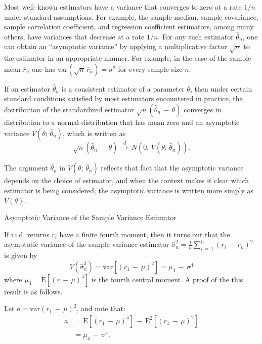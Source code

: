 \documentclass[graybox,envcountchap,sectrefs]{svmono}\usepackage[]{graphicx}\usepackage[]{xcolor}
\begin{document}
\begin{appendices}
Most well--known estimators have a variance that converges to zero
at a rate $1/n$ under standard assumptions. For example, the sample
median, sample covariance, sample correlation coefficient, and regression
coefficient estimators, among many others, have variances that decrease
at a rate $1/n$. For any such estimator $\hat{\theta}_{n}$, one
can obtain an ``asymptotic variance'' by applying a multiplicative
factor $\sqrt{n}$ to the estimator in an appropriate manner. For
example, in the case of the sample mean $\overline{r}_{n}$ one has
$\mathrm{var}\left(\sqrt{n}\,\overline{r}_{n}\right)=\sigma^{2}$
for every sample size $n$.

If an estimator $\hat{\theta}_{n}$ is a consistent estimator of a
parameter $\theta$, then under certain standard conditions satisfied
by most estimators encountered in practice, the distribution of the
standardized estimator $\sqrt{n}\left(\hat{\theta}_{n}\,-\,\theta\right)$
converges in distribution to a normal distribution that has mean zero
and an asymptotic variance $V\left(\theta;\,\hat{\theta}_{n}\right)$,
which is written as
\begin{equation}
\sqrt{n}\left(\hat{\theta}_{n}\,-\,\theta\right)\,\overset{d}{\rightarrow}\,N\left(0,\,V\left(\theta;\,\hat{\theta}_{n}\right)\right).\label{eq: sqrtnStandardizedEstimator}
\end{equation}

The argument $\hat{\theta}_{n}$ in $V\left(\theta;\,\hat{\theta}_{n}\right)$
reflects that fact that the asymptotic variance depends on the choice
of estimator, and when the context makes it clear which estimator
is being considered, the asymptotic variance is written more simply
as $V\left(\theta\right)$.
\begin{example}
Asymptotic Variance of the Sample Variance Estimator
\end{example}
If i.i.d. returns $r_{i}$ have a finite fourth moment, then it turns
out that the asymptotic variance of the sample variance estimator
$\hat{\sigma}_{n}^{2}=\frac{1}{n}\sum_{i\,=\,1}^{n}\left(r_{i}\,-\,\bar{r}_{n}\right)^{2}$
is given by
\begin{equation}
V(\hat{\sigma}_{n}^{2})=\mathrm{var}\left[\left(r_{1}\,-\,\mu\right)^{2}\right]=\mu_{4}\,-\,\sigma^{4}\label{eq: asympVarianceSampleVariance}
\end{equation}
where $\mu_{4}=\mathrm{E}\left[(r\,-\,\mu)^{4}\right]$ is the fourth
central moment. A proof of the this result is as follows.

Let $a=\mathrm{var}\left(r_{1}\,-\,\mu\right)^{2}$, and note that:
\begin{align*}
a & =\mathrm{E}\left[(r_{1}\,-\,\mu)^{4}\right]\,-\,\mathrm{E}^{2}\left[(r_{1}\,-\,\mu)^{2}\right]\\
 & =\mu_{4}\,-\,\sigma^{4}.
\end{align*}


\end{appendices}
\end{document}
